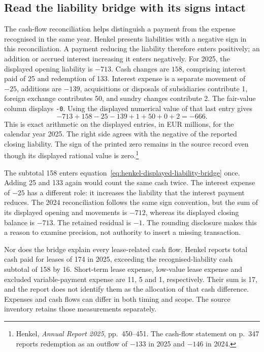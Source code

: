 \subsection{Read the liability bridge with its signs intact}

The cash-flow reconciliation helps distinguish a payment from the expense
recognised in the same year. Henkel presents liabilities with a negative sign
in this reconciliation. A payment reducing the liability therefore enters
positively; an addition or accrued interest increasing it enters negatively.
For 2025, the displayed opening liability is $-713$. Cash changes are $158$,
comprising interest paid of 25 and redemption of 133. Interest expense is a
separate movement of $-25$, additions are $-139$, acquisitions or disposals of
subsidiaries contribute 1, foreign exchange contributes 50, and sundry changes
contribute 2. The fair-value column displays \texttt{-0}.
Using the displayed numerical value of that last entry gives
\begin{equation}
\label{eq:henkel-displayed-liability-bridge}
 -713+158-25-139+1+50+0+2=-666.
\end{equation}
This is exact arithmetic on the displayed entries, in EUR millions, for the
calendar year 2025. The right side agrees with the negative of the reported
closing liability. The sign of the printed zero remains in the source record
even though its displayed rational value is zero.\footnote{Henkel,
\emph{Annual Report 2025}, pp.~450--451. The cash-flow statement on p.~347
reports redemption as an outflow of $-133$ in 2025 and $-146$ in 2024.}

The subtotal 158 enters equation~\eqref{eq:henkel-displayed-liability-bridge}
once. Adding 25 and 133 again would count the same cash twice. The interest
expense of $-25$ has a different role: it increases the liability that the
interest payment reduces. The 2024 reconciliation follows the same sign
convention, but the sum of its displayed opening and movements is $-712$,
whereas its displayed closing balance is $-713$. The retained residual is
$-1$. The rounding disclosure makes this a reason to examine precision, not
authority to insert a missing transaction.

Nor does the bridge explain every lease-related cash flow. Henkel reports
total cash paid for leases of 174 in 2025, exceeding the recognised-liability
cash subtotal of 158 by 16. Short-term lease expense, low-value lease expense
and excluded variable-payment expense are 11, 5 and 1, respectively. Their
sum is 17, and the report does not identify them as the allocation of that cash
difference. Expenses and cash flows can differ in both timing and scope. The
source inventory retains those measurements separately.

